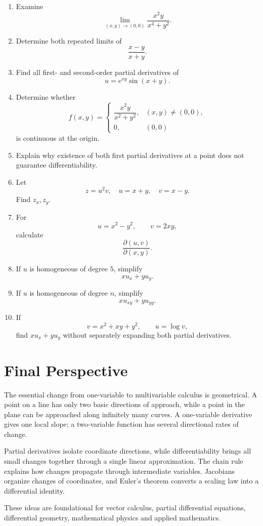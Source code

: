 \documentclass[11pt,oneside]{book}
\theoremstyle{studentthm}
\theoremstyle{definition}
\begin{document}
\begin{enumerate}
\item Examine
\[
\lim_{(x,y)\to(0,0)}
\frac{x^2y}{x^4+y^2}.
\]

\item Determine both repeated limits of
\[
\frac{x-y}{x+y}.
\]

\item Find all first- and second-order partial derivatives of
\[
u=e^{xy}\sin(x+y).
\]

\item Determine whether
\[
f(x,y)=
\begin{cases}
\dfrac{x^2y}{x^2+y^2},&(x,y)\ne(0,0),\\
0,&(0,0)
\end{cases}
\]
is continuous at the origin.

\item Explain why existence of both first partial derivatives at a
point does not guarantee differentiability.

\item Let
\[
z=u^2v,\quad u=x+y,\quad v=x-y.
\]
Find \(z_x,z_y\).

\item For
\[
u=x^2-y^2,\qquad v=2xy,
\]
calculate
\[
\frac{\partial(u,v)}{\partial(x,y)}.
\]

\item If \(u\) is homogeneous of degree \(5\), simplify
\[
xu_x+yu_y.
\]

\item If \(u\) is homogeneous of degree \(n\), simplify
\[
xu_{xy}+yu_{yy}.
\]

\item If
\[
v=x^2+xy+y^2,
\qquad
u=\log v,
\]
find \(xu_x+yu_y\) without separately expanding both partial
derivatives.
\end{enumerate}

\backmatter

\chapter*{Final Perspective}

The essential change from one-variable to multivariable calculus is
geometrical. A point on a line has only two basic directions of
approach, while a point in the plane can be approached along infinitely
many curves. A one-variable derivative gives one local slope; a
two-variable function has several directional rates of change.

Partial derivatives isolate coordinate directions, while
differentiability brings all small changes together through a single
linear approximation. The chain rule explains how changes propagate
through intermediate variables. Jacobians organize changes of
coordinates, and Euler's theorem converts a scaling law into a
differential identity.

These ideas are foundational for vector calculus, partial differential
equations, differential geometry, mathematical physics and applied
mathematics.
\end{document}
